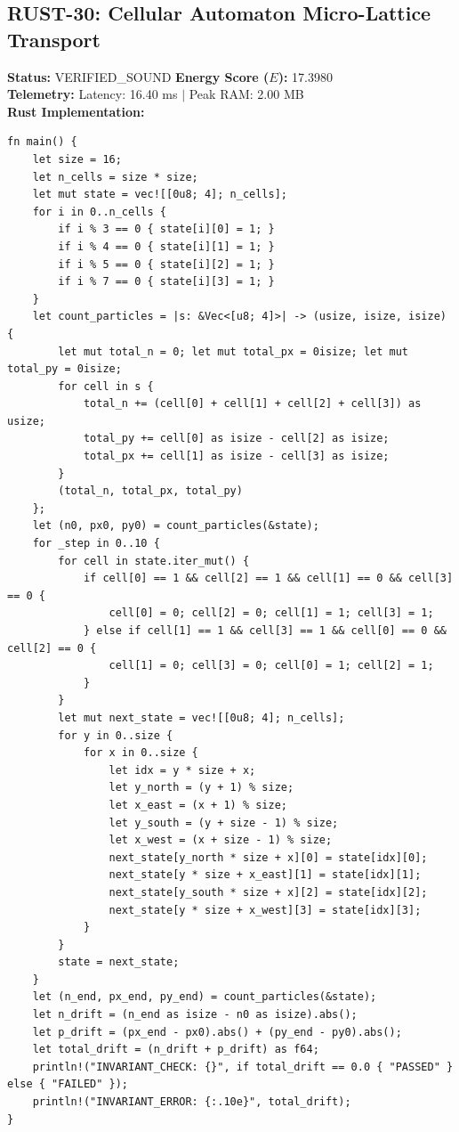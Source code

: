 \documentclass[11pt, a4paper]{article}
\begin{document}
\subsection{RUST-30: Cellular Automaton Micro-Lattice Transport}
\textbf{Status:} VERIFIED\_SOUND \hfill \textbf{Energy Score ($E$):} 17.3980\\
\textbf{Telemetry:} Latency: 16.40 ms $|$ Peak RAM: 2.00 MB\\
\textbf{Rust Implementation:}
\begin{verbatim}
fn main() {
    let size = 16;
    let n_cells = size * size;
    let mut state = vec![[0u8; 4]; n_cells];
    for i in 0..n_cells {
        if i % 3 == 0 { state[i][0] = 1; }
        if i % 4 == 0 { state[i][1] = 1; }
        if i % 5 == 0 { state[i][2] = 1; }
        if i % 7 == 0 { state[i][3] = 1; }
    }
    let count_particles = |s: &Vec<[u8; 4]>| -> (usize, isize, isize) {
        let mut total_n = 0; let mut total_px = 0isize; let mut total_py = 0isize;
        for cell in s {
            total_n += (cell[0] + cell[1] + cell[2] + cell[3]) as usize;
            total_py += cell[0] as isize - cell[2] as isize;
            total_px += cell[1] as isize - cell[3] as isize;
        }
        (total_n, total_px, total_py)
    };
    let (n0, px0, py0) = count_particles(&state);
    for _step in 0..10 {
        for cell in state.iter_mut() {
            if cell[0] == 1 && cell[2] == 1 && cell[1] == 0 && cell[3] == 0 {
                cell[0] = 0; cell[2] = 0; cell[1] = 1; cell[3] = 1;
            } else if cell[1] == 1 && cell[3] == 1 && cell[0] == 0 && cell[2] == 0 {
                cell[1] = 0; cell[3] = 0; cell[0] = 1; cell[2] = 1;
            }
        }
        let mut next_state = vec![[0u8; 4]; n_cells];
        for y in 0..size {
            for x in 0..size {
                let idx = y * size + x;
                let y_north = (y + 1) % size;
                let x_east = (x + 1) % size;
                let y_south = (y + size - 1) % size;
                let x_west = (x + size - 1) % size;
                next_state[y_north * size + x][0] = state[idx][0];
                next_state[y * size + x_east][1] = state[idx][1];
                next_state[y_south * size + x][2] = state[idx][2];
                next_state[y * size + x_west][3] = state[idx][3];
            }
        }
        state = next_state;
    }
    let (n_end, px_end, py_end) = count_particles(&state);
    let n_drift = (n_end as isize - n0 as isize).abs();
    let p_drift = (px_end - px0).abs() + (py_end - py0).abs();
    let total_drift = (n_drift + p_drift) as f64;
    println!("INVARIANT_CHECK: {}", if total_drift == 0.0 { "PASSED" } else { "FAILED" });
    println!("INVARIANT_ERROR: {:.10e}", total_drift);
}
\end{verbatim}
\end{document}
